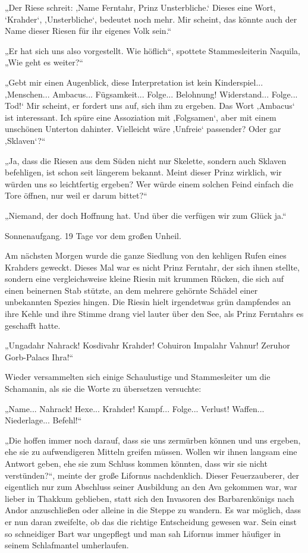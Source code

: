 „Der Riese schreit: ,Name Ferntahr, Prinz Unsterbliche.‘ Dieses eine Wort, ‘Krahder‘, ‚Unsterbliche‘, bedeutet noch mehr. Mir scheint, das könnte auch der Name dieser Riesen für ihr eigenes Volk sein.“

„Er hat sich uns also vorgestellt. Wie höflich“, spottete Stammesleiterin Naquila, „Wie geht es weiter?“

„Gebt mir einen Augenblick, diese Interpretation ist kein Kinderspiel... ‚Menschen... Ambacus... Fügsamkeit... Folge... Belohnung! Widerstand... Folge... Tod!‘ Mir scheint, er fordert uns auf, sich ihm zu ergeben. Das Wort ‚Ambacus‘ ist interessant. Ich spüre eine Assoziation mit ‚Folgsamen‘, aber mit einem unschönen Unterton dahinter. Vielleicht wäre ‚Unfreie‘ passender? Oder gar ‚Sklaven‘?“

„Ja, dass die Riesen aus dem Süden nicht nur Skelette, sondern auch Sklaven befehligen, ist schon seit längerem bekannt. Meint dieser Prinz wirklich, wir würden uns so leichtfertig ergeben? Wer würde einem solchen Feind einfach die Tore öffnen, nur weil er darum bittet?“

„Niemand, der doch Hoffnung hat. Und über die verfügen wir zum Glück ja.“



\trennzeichen



Sonnenaufgang. 19 Tage vor dem großen Unheil.\bigskip



Am nächsten Morgen wurde die ganze Siedlung von den kehligen Rufen eines Krahders geweckt. Dieses Mal war es nicht Prinz Ferntahr, der sich ihnen stellte, sondern eine vergleichsweise kleine Riesin mit krummen Rücken, die sich auf einen beinernen Stab stützte, an dem mehrere gehörnte Schädel einer unbekannten Spezies hingen. Die Riesin hielt irgendetwas grün dampfendes an ihre Kehle und ihre Stimme drang viel lauter über den See, als Prinz Ferntahrs es geschafft hatte.

„Ungadahr Nahrack! Kosdivahr Krahder! Cohuiron Impalahr Vahnur! Zeruhor Gorb-Palacs Ihra!“

Wieder versammelten sich einige Schaulustige und Stammesleiter um die Schamanin, als sie die Worte zu übersetzen versuchte:

„Name... Nahrack! Hexe... Krahder! Kampf... Folge... Verlust! Waffen... Niederlage... Befehl!“

„Die hoffen immer noch darauf, dass sie uns zermürben können und uns ergeben, ehe sie zu aufwendigeren Mitteln greifen müssen. Wollen wir ihnen langsam eine Antwort geben, ehe sie zum Schluss kommen könnten, dass wir sie nicht verstünden?“, meinte der große Lifornus nachdenklich. Dieser Feuerzauberer, der eigentlich nur zum Abschluss seiner Ausbildung an den Ava gekommen war, war lieber in Thakkum geblieben, statt sich den Invasoren des Barbarenkönigs nach Andor anzuschließen oder alleine in die Steppe zu wandern. Es war möglich, dass er nun daran zweifelte, ob das die richtige Entscheidung gewesen war. Sein einst so schneidiger Bart war ungepflegt und man sah Lifornus immer häufiger in seinem Schlafmantel umherlaufen.

